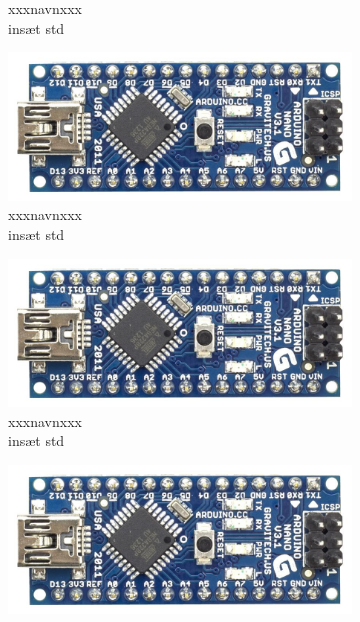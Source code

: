 \begin{titlepage}
\begin{figure}[b!]
\begin{subfigure}[1]{0.20\linewidth}
    \captionsetup{justification=centering}
    \caption[]{{\small xxxnavnxxx}\\{insæt std}}
    \end{subfigure}
    \hspace{2em}
     \begin{subfigure}[1]{0.20\linewidth}
    \includegraphics[width=\linewidth]{Overleaf/Pictures/Frontpage/ardrinon nano.jpg}
    \captionsetup{justification=centering}
    \caption[]{{\small xxxnavnxxx}\\{insæt std}}
    \end{subfigure}
    \hspace{2em}
     \begin{subfigure}[1]{0.20\linewidth}
    \includegraphics[width=\linewidth]{Overleaf/Pictures/Frontpage/ardrinon nano.jpg}
    \captionsetup{justification=centering}
    \caption[]{{\small xxxnavnxxx}\\{insæt std}}
    \end{subfigure}
    \hspace{2em}
     \begin{subfigure}[1]{0.20\linewidth}
    \includegraphics[width=\linewidth]{Overleaf/Pictures/Frontpage/ardrinon nano.jpg}

\end{subfigure}
\end{figure}
\end{titlepage}
